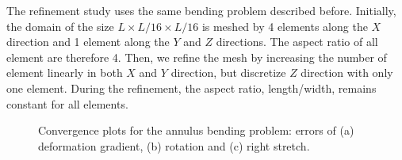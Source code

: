 \documentclass[12pt]{article}
\begin{document}
The refinement study uses the same bending problem described
before. Initially, the domain of the size $L \times L/16 \times L/16$
is meshed by 4 elements along the $X$ direction and 1 element along
the $Y$ and $Z$ directions. The aspect ratio of all element are
therefore 4. Then, we refine the mesh by increasing the number of
element linearly in both $X$ and $Y$ direction, but discretize $Z$
direction with only one element.  During the refinement, the aspect
ratio, length/width, remains constant for all elements.
\begin{figure}[htbp]
  \begin{center}
    \unitlength=1.0mm
    \caption{Convergence plots for the annulus bending problem: errors
      of (a) deformation gradient, (b) rotation and (c) right
      stretch.}
    \label{fig:RingRefinement}
  \end{center}
\end{figure}
\end{document}
